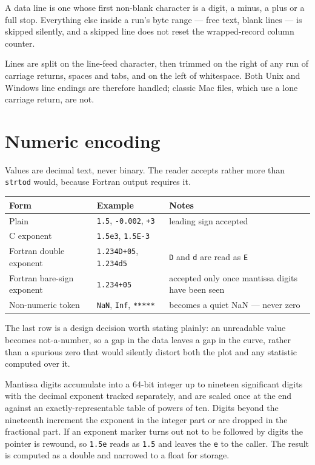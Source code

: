 \documentclass[11pt,a4paper,oneside]{report}
\newcommand{\code}[1]{\texttt{#1}}
\begin{document}
A data line is one whose first non-blank character is a digit, a minus, a plus or
a full stop. Everything else inside a run's byte range --- free text, blank lines
--- is skipped silently, and a skipped line does not reset the wrapped-record
column counter.

Lines are split on the line-feed character, then trimmed on the right of any run
of carriage returns, spaces and tabs, and on the left of whitespace. Both Unix
and Windows line endings are therefore handled; classic Mac files, which use a
lone carriage return, are not.

\section{Numeric encoding}

Values are decimal text, never binary. The reader accepts rather more than
\code{strtod} would, because Fortran output requires it.

\begin{center}
\small
\begin{tabular}{@{}p{}p{}p{}@{}}
\toprule
\textbf{Form} & \textbf{Example} & \textbf{Notes} \\
\midrule
Plain & \code{1.5}, \code{-0.002}, \code{+3} & leading sign accepted \\
C exponent & \code{1.5e3}, \code{1.5E-3} & \\
Fortran double exponent & \code{1.234D+05}, \code{1.234d5} & \code{D} and \code{d} are read as \code{E} \\
Fortran bare-sign exponent & \code{1.234+05} & accepted only once mantissa digits have been seen \\
Non-numeric token & \code{NaN}, \code{Inf}, \code{*****} & becomes a quiet NaN --- never zero \\
\bottomrule
\end{tabular}
\end{center}

The last row is a design decision worth stating plainly: an unreadable value
becomes not-a-number, so a gap in the data leaves a gap in the curve, rather than
a spurious zero that would silently distort both the plot and any statistic
computed over it.

Mantissa digits accumulate into a 64-bit integer up to nineteen significant
digits with the decimal exponent tracked separately, and are scaled once at the
end against an exactly-representable table of powers of ten. Digits beyond the
nineteenth increment the exponent in the integer part or are dropped in the
fractional part. If an exponent marker turns out not to be followed by digits the
pointer is rewound, so \code{1.5e} reads as \code{1.5} and leaves the \code{e} to
the caller. The result is computed as a double and narrowed to a float for
storage.
\end{document}
